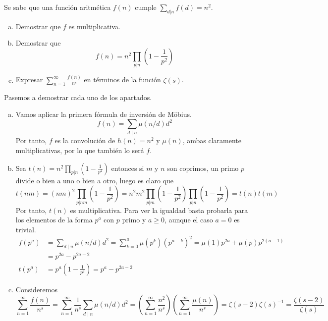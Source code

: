 \documentclass[twoside]{article}
\begin{document}
\begin{ejercicio}{7}
Se sabe que una función aritmética $f(n)$ cumple $\sum_{d|n} f(d) = n^2$.
\begin{enumerate}[(a)]
\item Demostrar que $f$ es multiplicativa.
\item Demostrar que
\[ f(n) = n^2 \prod_{p|n} \left(1-\frac{1}{p^2}\right)\]
\item Expresar $\sum_{n=1}^{∞} \frac{f(n)}{n^s}$ en términos de la función $ζ(s)$.
\end{enumerate}
\end{ejercicio}
\begin{solucion} Pasemos a demostrar cada uno de los apartados.
 \begin{enumerate}[(a)]
 \item Vamos aplicar la primera fórmula de inversión de Möbius.
 $$
 f(n)=\sum_{d\mid n}\mu(n/d)d^2
 $$
 Por tanto, $f$ es la convolución de $h(n)=n^2$ y $\mu(n)$, ambas claramente multiplicativas, por lo que también lo será $f$.
 \item Sea $t(n) = n^2 \prod_{p|n} \left(1-\frac{1}{p^2}\right)$ entonces si $m$ y $n$ son coprimos, un primo $p$ divide o bien a uno o bien a otro, luego es claro que
 $$
 t(nm) = (nm)^2\prod_{p|nm} \left(1-\frac{1}{p^2}\right) = n^2m^2\prod_{p|m} \left(1-\frac{1}{p^2}\right)\prod_{p|n} \left(1-\frac{1}{p^2}\right)=t(n)t(m)
 $$
 Por tanto, $t(n)$ es multiplicativa. Para ver la igualdad basta probarla para los elementos de la forma $p^a$ con $p$ primo y $a\geq 0$, aunque el caso $a=0$ es trivial.
 \begin{align*}
 f(p^a)&= \sum_{d\mid n}\mu(n/d)d^2 = \sum_{k=0}^a\mu(p^k)(p^{a-k})^2 = \mu(1)p^{2a} + \mu(p)p^{2(a-1)}\\
 &=p^{2a}-p^{2a-2}\\
 t(p^a)&= p^a \left(1-\frac{1}{p^2}\right) = p^a - p^{2a-2}
 \end{align*}
 \item Consideremos
 $$
 \sum_{n=1}^{∞} \frac{f(n)}{n^s} = \sum_{n=1}^{∞} \frac{1}{n^s} \sum_{d\mid n}\mu(n/d)d^2 = \left( \sum_{n=1}^{∞} \frac{n^2}{n^s} \right)\left( \sum_{n=1}^{∞} \frac{\mu(n)}{n^s} \right) = \zeta(s-2)\zeta(s)^{-1} = \frac{\zeta(s-2)}{\zeta(s)}
 $$
 \end{enumerate}
\end{solucion}
\newpage
\end{document}
